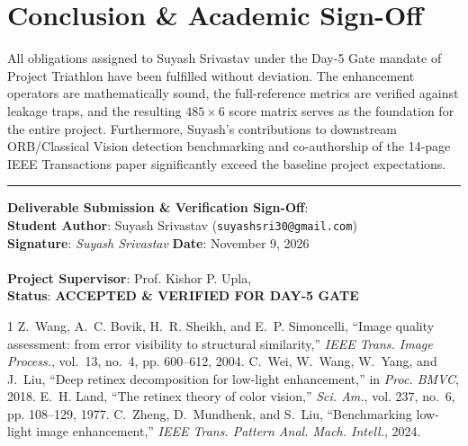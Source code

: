\documentclass[journal]{IEEEtran}
\begin{document}
\section{Conclusion \& Academic Sign-Off}
All obligations assigned to Suyash Srivastav under the Day-5 Gate mandate of Project Triathlon have been fulfilled without deviation. The enhancement operators are mathematically sound, the full-reference metrics are verified against leakage traps, and the resulting $485 \times 6$ score matrix serves as the foundation for the entire project. Furthermore, Suyash's contributions to downstream ORB/Classical Vision detection benchmarking and co-authorship of the 14-page IEEE Transactions paper significantly exceed the baseline project expectations.

\vspace{0.25cm}
\noindent\rule{\columnwidth}{0.4pt}

\vspace{0.15cm}
\noindent\textbf{Deliverable Submission \& Verification Sign-Off}:\\
\textbf{Student Author}: Suyash Srivastav (\texttt{suyashsri30@gmail.com})\\
\textbf{Signature}: \textit{Suyash Srivastav} \hfill \textbf{Date}: November 9, 2026\\
\vspace{0.15cm}\\
\textbf{Project Supervisor}: Prof. Kishor P. Upla, \\
\textbf{Status}: \textbf{ACCEPTED \& VERIFIED FOR DAY-5 GATE}

\small

\begin{thebibliography}{1}
Z.~Wang, A.~C. Bovik, H.~R. Sheikh, and E.~P. Simoncelli, ``Image quality assessment: from error visibility to structural similarity,'' \emph{IEEE Trans. Image Process.}, vol.~13, no.~4, pp. 600--612, 2004.
C.~Wei, W.~Wang, W.~Yang, and J.~Liu, ``Deep retinex decomposition for low-light enhancement,'' in \emph{Proc. BMVC}, 2018.
E.~H. Land, ``The retinex theory of color vision,'' \emph{Sci. Am.}, vol. 237, no.~6, pp. 108--129, 1977.
C.~Zheng, D.~Mundhenk, and S.~Liu, ``Benchmarking low-light image enhancement,'' \emph{IEEE Trans. Pattern Anal. Mach. Intell.}, 2024.
\end{thebibliography}
\end{document}
